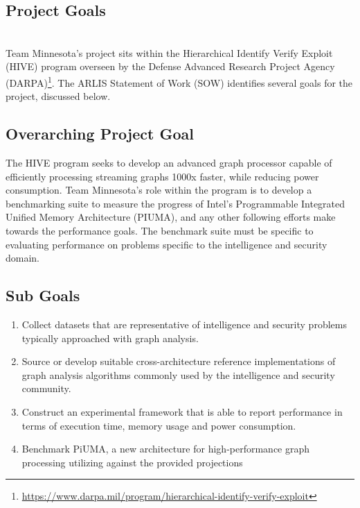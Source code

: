 \documentclass[letterpaper, 10pt]{article}
\begin{document}
\clearpage
\begin{multicols}{2}    
    \section{Project Goals}\label{section:goals}
    \\
    Team Minnesota's project sits within the Hierarchical Identify Verify Exploit (HIVE) program overseen by the Defense Advanced Research Project Agency (DARPA)\footnote{\href{https://www.darpa.mil/program/hierarchical-identify-verify-exploit}{https://www.darpa.mil/program/hierarchical-identify-verify-exploit}}. The ARLIS Statement of Work (SOW) identifies several goals for the project, discussed below. 
        \subsection{Overarching Project Goal}\label{section:projectGoal}
        The HIVE program seeks to develop an advanced graph processor capable of efficiently processing streaming graphs 1000x faster, while reducing power consumption. 
        Team Minnesota's role within the program is to develop a benchmarking suite to measure the progress of Intel's Programmable Integrated Unified Memory Architecture (PIUMA), and any other following efforts make towards the performance goals. 
        The benchmark suite must be specific to evaluating performance on problems specific to the intelligence and security domain.
        \subsection{Sub Goals}\label{section:subGoals}
        \begin{enumerate}
        \item Collect datasets that are representative of intelligence and security problems typically approached with graph analysis. 
        \item Source or develop suitable cross-architecture reference implementations of graph analysis algorithms commonly used by the intelligence and security community. 
        \item Construct an experimental framework that is able to report performance in terms of execution time, memory usage and power consumption.
        \item Benchmark PiUMA, a new architecture for high-performance graph processing utilizing against the provided projections 
        \end{enumerate}


\end{multicols}
\end{document}
